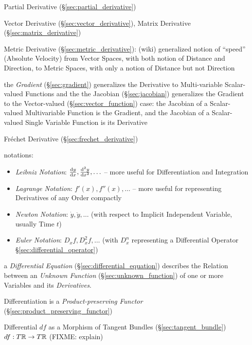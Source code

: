 \asterism

\fist Partial Derivative (\S\ref{sec:partial_derivative})

\fist Vector Derivative (\S\ref{sec:vector_derivative}), Matrix Derivative
(\S\ref{sec:matrix_derivative})

\fist Metric Derivative (\S\ref{sec:metric_derivative}): (wiki) generalized
notion of ``speed'' (Absolute Velocity) from Vector Spaces, with both notion of
Distance and Direction, to Metric Spaces, with only a notion of Distance but not
Direction

\fist the \emph{Gradient} (\S\ref{sec:gradient}) generalizes the Derivative to
Multi-variable Scalar-valued Functions and the the Jacobian
(\S\ref{sec:jacobian}) generalizes the Gradient to the Vector-valued
(\S\ref{sec:vector_function}) case: the Jacobian of a Scalar-valued
Multivariable Function is the Gradient, and the Jacobian of a Scalar-valued
Single Variable Function is its Derivative

\fist Fr\'echet Derivative (\S\ref{sec:frechet_derivative})

notations:
\begin{itemize}
  \item \emph{Leibniz Notation}: $\frac{\mathrm{d}y}{\mathrm{d}x}, \frac{\mathrm{d}^2{y}}{\mathrm{d}x^2}, \ldots$
    -- more useful for Differentiation and Integration
  \item \emph{Lagrange Notation}: $f'(x), f''(x), \ldots$
    -- more useful for representing Derivatives of any Order compactly
  \item \emph{Newton Notation}: $\dot{y}, \ddot{y}, \ldots$ (with respect to
    Implicit Independent Variable, usually Time $t$)
  \item \emph{Euler Notation}: $D_x{f}, D^2_x{f}, \ldots$ (with $D_x^n$
    representing a Differential Operator \S\ref{sec:differential_operator})
\end{itemize}

\fist a \emph{Differential Equation} (\S\ref{sec:differential_equation})
describes the Relation between an \emph{Unknown Function}
(\S\ref{sec:unknown_function}) of one or more Variables and its
\emph{Derivatives}.

Differentiation is a \emph{Product-preserving Functor}
(\S\ref{sec:product_preserving_functor})

Differential $df$ as a Morphism of Tangent Bundles (\S\ref{sec:tangent_bundle})
$df : T\mathbb{R} \rightarrow T\mathbb{R}$ (FIXME: explain)

\asterism

